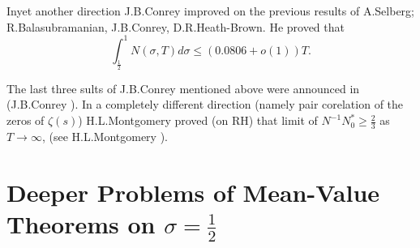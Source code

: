 In\pageoriginale yet another direction J.B.\@ Conrey improved on the
previous results of A.\@ Selberg; R.\@ Balasubramanian, J.B.\@ Conrey,
{\small D.R.\@ Heath-Brown}. He proved that
$$
\int^{1}_{\frac{1}{2}}N(\sigma,T)d\sigma\leq (0.0806+o(1))T.
$$

The last three sults of J.B.\@ Conrey mentioned above were announced
in (J.B.\@ Conrey \cite{Conrey2}). In a completely different direction
(namely pair corelation of the zeros of $\zeta(s)$) H.L.\@ Montgomery
proved (on RH) that limit of $N^{-1}N^{*}_{0}\geq \frac{2}{3}$ as
$T\to \infty$, (see H.L.\@ Montgomery \cite{Montgomery4}).

\section{Deeper Problems of Mean-Value Theorems on
  $\sigma=\frac{1}{2}$}\label{c6:sec6.3}

